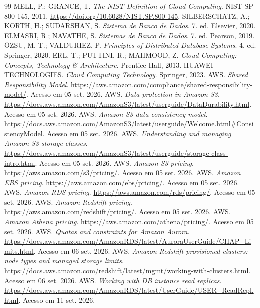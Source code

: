 \documentclass[11pt,a4paper]{article}
\begin{document}
\clearpage
\begin{thebibliography}{99}
 MELL, P.; GRANCE, T. \textit{The NIST Definition of Cloud Computing}. NIST SP 800-145, 2011. \url{https://doi.org/10.6028/NIST.SP.800-145}.
 SILBERSCHATZ, A.; KORTH, H.; SUDARSHAN, S. \textit{Sistema de Banco de Dados}. 7. ed. Elsevier, 2020.
 ELMASRI, R.; NAVATHE, S. \textit{Sistemas de Banco de Dados}. 7. ed. Pearson, 2019.
 ÖZSU, M. T.; VALDURIEZ, P. \textit{Principles of Distributed Database Systems}. 4. ed. Springer, 2020.
 ERL, T.; PUTTINI, R.; MAHMOOD, Z. \textit{Cloud Computing: Concepts, Technology \& Architecture}. Prentice Hall, 2013.
 HUAWEI TECHNOLOGIES. \textit{Cloud Computing Technology}. Springer, 2023.
 AWS. \textit{Shared Responsibility Model}. \url{https://aws.amazon.com/compliance/shared-responsibility-model/}. Acesso em 05 set. 2026.
 AWS. \textit{Data protection in Amazon S3}. \url{https://docs.aws.amazon.com/AmazonS3/latest/userguide/DataDurability.html}. Acesso em 05 set. 2026.
 AWS. \textit{Amazon S3 data consistency model}. \url{https://docs.aws.amazon.com/AmazonS3/latest/userguide/Welcome.html#ConsistencyModel}. Acesso em 05 set. 2026.
 AWS. \textit{Understanding and managing Amazon S3 storage classes}. \url{https://docs.aws.amazon.com/AmazonS3/latest/userguide/storage-class-intro.html}. Acesso em 05 set. 2026.
 AWS. \textit{Amazon S3 pricing}. \url{https://aws.amazon.com/s3/pricing/}. Acesso em 05 set. 2026.
 AWS. \textit{Amazon EBS pricing}. \url{https://aws.amazon.com/ebs/pricing/}. Acesso em 05 set. 2026.
 AWS. \textit{Amazon RDS pricing}. \url{https://aws.amazon.com/rds/pricing/}. Acesso em 05 set. 2026.
 AWS. \textit{Amazon Redshift pricing}. \url{https://aws.amazon.com/redshift/pricing/}. Acesso em 05 set. 2026.
 AWS. \textit{Amazon Athena pricing}. \url{https://aws.amazon.com/athena/pricing/}. Acesso em 05 set. 2026.
 AWS. \textit{Quotas and constraints for Amazon Aurora}. \url{https://docs.aws.amazon.com/AmazonRDS/latest/AuroraUserGuide/CHAP_Limits.html}. Acesso em 06 set. 2026.
 AWS. \textit{Amazon Redshift provisioned clusters: node types and managed storage limits}. \url{https://docs.aws.amazon.com/redshift/latest/mgmt/working-with-clusters.html}. Acesso em 06 set. 2026.
 AWS. \textit{Working with DB instance read replicas}. \url{https://docs.aws.amazon.com/AmazonRDS/latest/UserGuide/USER_ReadRepl.html}. Acesso em 11 set. 2026.

\end{thebibliography}
\end{document}
